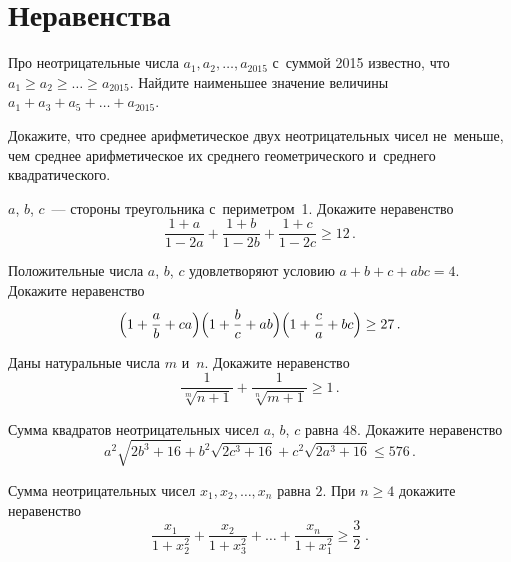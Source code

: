 
\section*{Неравенства}


\begin{problems}

\item
Про неотрицательные числа $a_{1}, a_{2}, \ldots, a_{2015}$ с~суммой 2015
известно, что $a_1 \geq a_2 \geq \ldots \geq a_{2015}$.
Найдите наименьшее значение величины $a_1 + a_3 + a_5 + \ldots + a_{2015}$.

\item
Докажите, что среднее арифметическое двух неотрицательных чисел не~меньше, чем
среднее арифметическое их среднего геометрического и~среднего квадратического.

\item
$a$, $b$, $c$~--- стороны треугольника с~периметром~1.
Докажите неравенство
\[
    \frac{1 + a}{1 - 2 a} +
    \frac{1 + b}{1 - 2 b} +
    \frac{1 + c}{1 - 2 c}
\geq
    12
\, . \]

\item
Положительные числа $a$, $b$, $c$ удовлетворяют условию
$a + b + c + a b c = 4$.
Докажите неравенство
\[
    \Bigl(
        1 + \frac{a}{b} + c a
    \Bigr)
    \Bigl(
        1 + \frac{b}{c} + a b
    \Bigr)
    \Bigl(
        1 + \frac{c}{a} + b c
    \Bigr)
\geq
    27
\, . \]

\item
Даны натуральные числа $m$ и~$n$.
Докажите неравенство
\[
    \frac{1}{\sqrt[m]{n + 1}} + \frac{1}{\sqrt[n]{m + 1}}
\geq
    1
\, . \]

\item
Сумма квадратов неотрицательных чисел $a$, $b$, $c$ равна $48$.
Докажите неравенство
\[
    a^2 \sqrt{2 b^3 + 16} +
    b^2 \sqrt{2 c^3 + 16} +
    c^2 \sqrt{2 a^3 + 16}
\leq
    576
\, . \]

\item
Сумма неотрицательных чисел $x_1, x_2, \ldots, x_n$ равна $2$.
При $n \geq 4$ докажите неравенство
\[
    \frac{x_{1}}{1 + x_{2}^2} +
    \frac{x_{2}}{1 + x_{3}^2} +
    \ldots +
    \frac{x_{n}}{1 + x_{1}^2}
\geq
    \frac{3}{2}
\; . \]

\end{problems}

